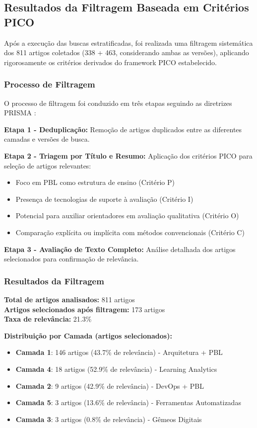 \documentclass[english, spanish, brazilian]{RBIEarticle} %
\begin{document}
\subsection{Resultados da Filtragem Baseada em Critérios PICO}

Após a execução das buscas estratificadas, foi realizada uma filtragem sistemática dos 811 artigos coletados (338 + 463, considerando ambas as versões), aplicando rigorosamente os critérios derivados do framework PICO estabelecido.

\subsubsection{Processo de Filtragem}

O processo de filtragem foi conduzido em três etapas seguindo as diretrizes PRISMA \parencite{Page2021}:

\textbf{Etapa 1 - Deduplicação:} Remoção de artigos duplicados entre as diferentes camadas e versões de busca.

\textbf{Etapa 2 - Triagem por Título e Resumo:} Aplicação dos critérios PICO para seleção de artigos relevantes:
\begin{itemize}
\item Foco em PBL como estrutura de ensino (Critério P)
\item Presença de tecnologias de suporte à avaliação (Critério I)  
\item Potencial para auxiliar orientadores em avaliação qualitativa (Critério O)
\item Comparação explícita ou implícita com métodos convencionais (Critério C)
\end{itemize}

\textbf{Etapa 3 - Avaliação de Texto Completo:} Análise detalhada dos artigos selecionados para confirmação de relevância.

\subsubsection{Resultados da Filtragem}

\textbf{Total de artigos analisados:} 811 artigos\\
\textbf{Artigos selecionados após filtragem:} 173 artigos\\
\textbf{Taxa de relevância:} 21.3\%

\textbf{Distribuição por Camada (artigos selecionados):}
\begin{itemize}
\item \textbf{Camada 1}: 146 artigos (43.7\% de relevância) - Arquitetura + PBL
\item \textbf{Camada 4}: 18 artigos (52.9\% de relevância) - Learning Analytics  
\item \textbf{Camada 2}: 9 artigos (42.9\% de relevância) - DevOps + PBL
\item \textbf{Camada 5}: 3 artigos (13.6\% de relevância) - Ferramentas Automatizadas
\item \textbf{Camada 3}: 3 artigos (0.8\% de relevância) - Gêmeos Digitais
\end{itemize}
\end{document}
